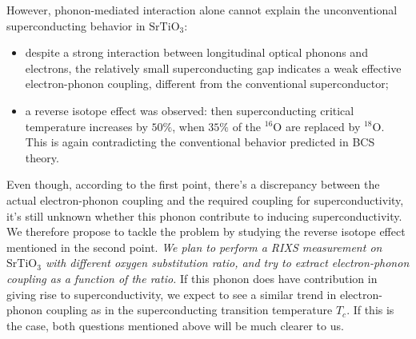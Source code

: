 \documentclass[11pt]{article}
\begin{document}
However, phonon-mediated interaction alone cannot explain the unconventional superconducting behavior in $\mathrm{SrTiO_{3}}$:
\begin{itemize}
  \item despite a strong interaction between longitudinal optical phonons and electrons, the relatively small superconducting gap indicates a weak effective electron-phonon coupling, different from the conventional superconductor; 
  \item a reverse isotope effect was observed: then superconducting critical temperature increases by $50\%$, when $35\%$ of the ${}^{16}\mathrm{O}$ are replaced by ${}^{18}\mathrm{O}$\cite{stucky_isotope_2016}. This is again contradicting the conventional behavior predicted in BCS theory.
\end{itemize}
Even though, according to the first point, there's a discrepancy between the actual electron-phonon coupling and the required coupling for superconductivity, it's still unknown whether this phonon contribute to inducing superconductivity. We therefore propose to tackle the problem by studying the reverse isotope effect mentioned in the second point. \textit{We plan to perform a RIXS measurement on $\mathrm{SrTiO_{3}}$ with different oxygen substitution ratio, and try to extract electron-phonon coupling as a function of the ratio.}  If this phonon does have  contribution in giving rise to superconductivity, we expect to see a similar trend in electron-phonon coupling as in the superconducting transition temperature $T_{c}$. If this is the case, both questions mentioned above will be much clearer to us. 
\end{document}
